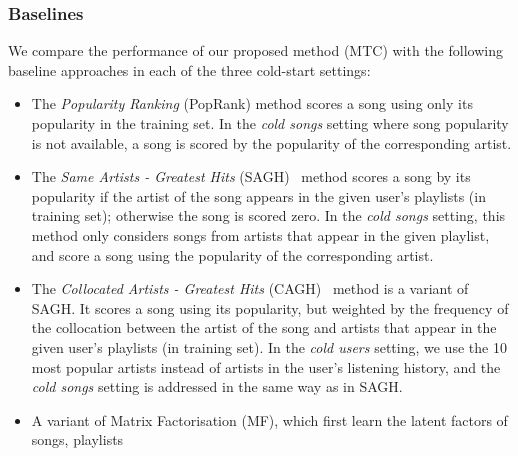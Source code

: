 %


\subsubsection{Baselines}
We compare the performance of our proposed method (\ie MTC) %
with the following %
baseline approaches in each of the three cold-start settings:
\begin{itemize}
\item The {\it Popularity Ranking} (PopRank) method scores a song using only its popularity in the training set.
      In the \emph{cold songs} setting where song popularity is not available, 
      a song is scored by the popularity of the corresponding artist.
\item The {\it Same Artists - Greatest Hits} (SAGH)~\cite{mcfee2012million} method scores a song
      by its popularity if the artist of the song appears in the given user's playlists (in training set);
      otherwise the song is scored zero.
      In the {\it cold songs} setting, this method only considers songs from artists that appear in the given playlist,
      and score a song using the popularity of the corresponding artist.
\item The {\it Collocated Artists - Greatest Hits} (CAGH)~\cite{bonnin2013evaluating} method is a variant of SAGH.
      It scores a song using its popularity, but weighted by the frequency of the collocation between the artist of the song
      and artists that appear in the given user's playlists (in training set).
      In the \emph{cold users} setting, we use the 10 most popular artists instead of artists 
      in the user's listening history, and the \emph{cold songs} setting is addressed in the same way as in SAGH.
\item A variant of Matrix Factorisation (MF), which first learn the latent factors of songs, playlists

\end{itemize}

